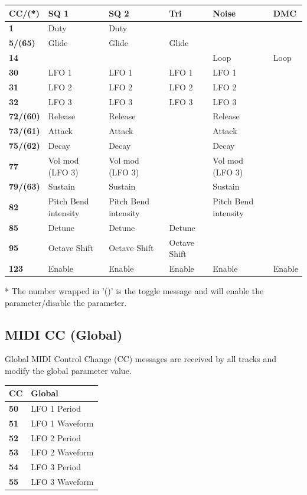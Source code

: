 \documentclass[a4paper, 12p]{extarticle}
\begin{document}
\begin{tabular}{l | l | l | l | l | l }
  CC/(*) & SQ 1 & SQ 2 & Tri & Noise & DMC\\ \hline
  \textbf{1} & Duty & Duty & & & \\
  \textbf{5/(65)} & Glide & Glide & Glide & & \\
  \textbf{14} &  &  &  & Loop & Loop \\
  \textbf{30} & LFO 1 & LFO 1 & LFO 1 & LFO 1 & \\
  \textbf{31} & LFO 2 & LFO 2 & LFO 2 & LFO 2 & \\
  \textbf{32} & LFO 3 & LFO 3 & LFO 3 & LFO 3 & \\
  \textbf{72/(60)} & Release & Release &  & Release & \\
  \textbf{73/(61)} & Attack & Attack &  & Attack & \\
  \textbf{75/(62)} & Decay & Decay &  & Decay & \\
  \textbf{77} & Vol mod (LFO 3) & Vol mod (LFO 3) &  & Vol mod (LFO 3) & \\
  \textbf{79/(63)} & Sustain & Sustain &  & Sustain &\\
  \textbf{82} & Pitch Bend intensity & Pitch Bend intensity &  & Pitch Bend intensity & \\
  \textbf{85} & Detune & Detune & Detune &  &\\
  \textbf{95} & Octave Shift & Octave Shift & Octave Shift &  &\\
  \textbf{123} & Enable & Enable & Enable & Enable & Enable\\
\end{tabular}

* The number wrapped in '()' is the toggle message and will enable the parameter/disable the parameter.

\subsection{MIDI CC (Global)}

Global MIDI Control Change (CC) messages are received by all tracks and modify the global parameter value.

\begin{tabular}{l | l}
  CC & Global \\ \hline
  \textbf{50} & LFO 1 Period\\
    \textbf{51} & LFO 1 Waveform\\
    \textbf{52} & LFO 2 Period\\
    \textbf{53} & LFO 2 Waveform\\
    \textbf{54} & LFO 3 Period\\
    \textbf{55} & LFO 3 Waveform\\
\end{tabular}
\end{document}
